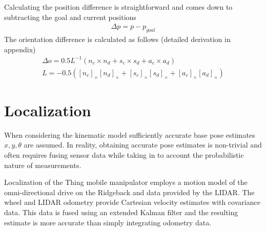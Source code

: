 \documentclass[times, utf8, diplomski, english]{fer}
\begin{document}
Calculating the position difference is straightforward and comes down to subtracting the goal and current positions
\begin{align}
\Delta p = p - p_{goal} 
\end{align}
The orientation difference is calculated as follows (detailed derivation in appendix)
\begin{subequations}\label{eq:pose difference}
\begin{gather}
\Delta o = 0.5 L^{-1} \left( n_c\times n_d + s_c\times s_d + a_c\times a_d \right) \\
L = - 0.5 \left(\left[n_c\right]_{\times}\left[n_d\right]_{\times} + \left[s_c\right]_{\times}\left[s_d\right]_{\times} 
+ \left[a_c\right]_{\times}\left[a_d\right]_{\times} \right)
\end{gather}
\end{subequations}
\section{Localization}\label{section:Localization}
When considering the kinematic model sufficiently accurate base pose estimates $x,y,\theta$ are assumed.
In reality, obtaining accurate pose estimates is non-trivial and often requires fusing sensor data while taking in to account the probabilistic nature of measurements.

Localization of the Thing mobile manipulator employs a motion model of the omni-directional drive on the Ridgeback and data provided by the LIDAR.
The wheel and LIDAR odometry provide Cartesian velocity estimates with covariance data.
This data is fused using an extended Kalman filter and the resulting estimate is more accurate than simply integrating odometry data.
\end{document}
